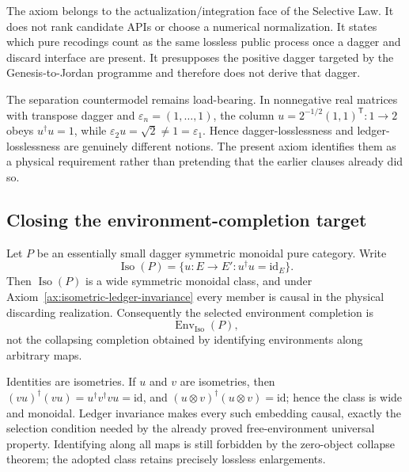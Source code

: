 \begin{remark}
The axiom belongs to the actualization/integration face of the Selective Law.  It
does not rank candidate APIs or choose a numerical normalization.  It states which
pure recodings count as the same lossless public process once a dagger and discard
interface are present.  It presupposes the positive dagger targeted by the
Genesis-to-Jordan programme and therefore does not derive that dagger.

The separation countermodel remains load-bearing.  In nonnegative real matrices
with transpose dagger and \(\varepsilon_n=(1,\ldots,1)\), the column
\(u=2^{-1/2}(1,1)^{\mathsf T}:1\to2\) obeys \(u^\dagger u=1\), while
\(\varepsilon_2u=\sqrt2\ne1=\varepsilon_1\).  Hence dagger-losslessness and
ledger-losslessness are genuinely different notions.  The present axiom identifies
them as a physical requirement rather than pretending that the earlier clauses
already did so.
\end{remark}

\subsection{Closing the environment-completion target}

\begin{theorem}
\label{thm:isometric-environment-class}
Let \(P\) be an essentially small dagger symmetric monoidal pure category.  Write
\[
 \operatorname{Iso}(P)
 =\{u:E\to E':u^\dagger u=\mathrm{id}_E\}.
\]
Then \(\operatorname{Iso}(P)\) is a wide symmetric monoidal class, and under
Axiom~\ref{ax:isometric-ledger-invariance} every member is causal in the physical
discarding realization.  Consequently the selected environment completion is
\[
 \boxed{\operatorname{Env}_{\operatorname{Iso}}(P),}
\]
not the collapsing completion obtained by identifying environments along arbitrary
maps.
\end{theorem}

\begin{proofsketch}
Identities are isometries.  If \(u\) and \(v\) are isometries, then
\((vu)^\dagger(vu)=u^\dagger v^\dagger vu=\mathrm{id}\), and
\((u\otimes v)^\dagger(u\otimes v)=\mathrm{id}\); hence the class is wide and
monoidal.  Ledger invariance makes every such embedding causal, exactly the
selection condition needed by the already proved free-environment universal
property.  Identifying along all maps is still forbidden by the zero-object
collapse theorem; the adopted class retains precisely lossless enlargements.
\end{proofsketch}

